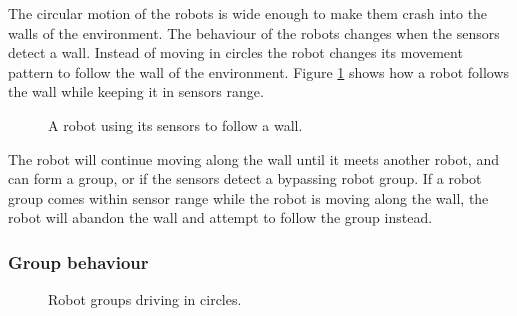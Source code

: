 The circular motion of the robots is wide enough to make them crash into the walls of the environment.
The behaviour of the robots changes when the sensors detect a wall.
Instead of moving in circles the robot changes its movement pattern to follow the wall of the environment.
Figure \ref{fig:individual-wall-drive} shows how a robot follows the wall while keeping it in sensors range.

\begin{figure}[H]    
	\centering
	\caption{A robot using its sensors to follow a wall.}
	\label{fig:individual-wall-drive}
\end{figure}


The robot will continue moving along the wall until it meets another robot, and can form a group, or if the sensors detect a bypassing robot group.
If a robot group comes within sensor range while the robot is moving along the wall, the robot will abandon the wall and attempt to follow the group instead.

\subsubsection{Group behaviour}


\begin{figure}[H]
	
	\centering
	\caption{Robot groups driving in circles.}
	\label{fig:group-circles}
\end{figure}

